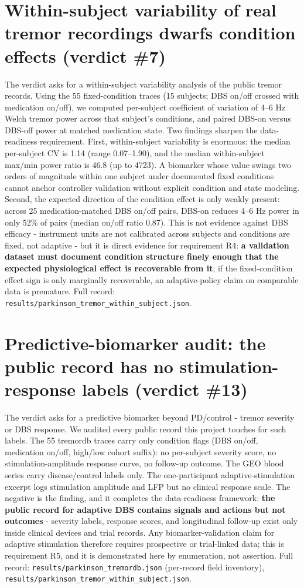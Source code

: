\section{Within-subject variability of real tremor recordings dwarfs condition effects (verdict \#7)}
The verdict asks for a within-subject variability analysis of the public tremor records. Using the 55 fixed-condition traces (15 subjects; DBS on/off crossed with medication on/off), we computed per-subject coefficient of variation of 4--6 Hz Welch tremor power across that subject's conditions, and paired DBS-on versus DBS-off power at matched medication state. Two findings sharpen the data-readiness requirement. First, within-subject variability is enormous: the median per-subject CV is 1.14 (range 0.07--1.90), and the median within-subject max/min power ratio is 46.8 (up to 4723). A biomarker whose value swings two orders of magnitude within one subject under documented fixed conditions cannot anchor controller validation without explicit condition and state modeling. Second, the expected direction of the condition effect is only weakly present: across 25 medication-matched DBS on/off pairs, DBS-on reduces 4--6 Hz power in only 52\% of pairs (median on/off ratio 0.87). This is not evidence against DBS efficacy - instrument units are not calibrated across subjects and conditions are fixed, not adaptive - but it is direct evidence for requirement R4: \textbf{a validation dataset must document condition structure finely enough that the expected physiological effect is recoverable from it}; if the fixed-condition effect sign is only marginally recoverable, an adaptive-policy claim on comparable data is premature. Full record: \texttt{results/parkinson\_tremor\_within\_subject.json}.


\section{Predictive-biomarker audit: the public record has no stimulation-response labels (verdict \#13)}
The verdict asks for a predictive biomarker beyond PD/control - tremor severity or DBS response. We audited every public record this project touches for such labels. The 55 tremordb traces carry only condition flags (DBS on/off, medication on/off, high/low cohort suffix): no per-subject severity score, no stimulation-amplitude response curve, no follow-up outcome. The GEO blood series carry disease/control labels only. The one-participant adaptive-stimulation excerpt logs stimulation amplitude and LFP but no clinical response scale. The negative is the finding, and it completes the data-readiness framework: \textbf{the public record for adaptive DBS contains signals and actions but not outcomes} - severity labels, response scores, and longitudinal follow-up exist only inside clinical devices and trial records. Any biomarker-validation claim for adaptive stimulation therefore requires prospective or trial-linked data; this is requirement R5, and it is demonstrated here by enumeration, not assertion. Full record: \texttt{results/parkinson\_tremordb.json} (per-record field inventory), \texttt{results/parkinson\_tremor\_within\_subject.json}.


